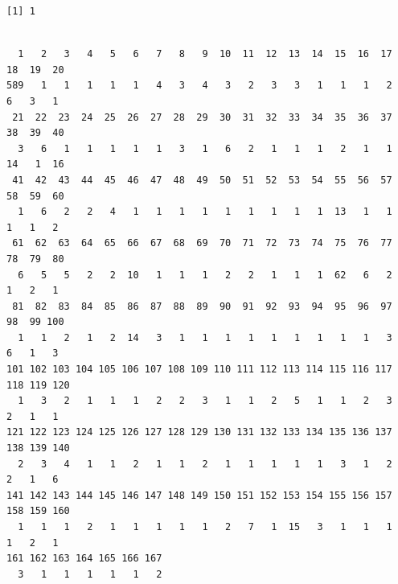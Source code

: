 \documentclass[
  letterpaper,
  DIV=11,
  numbers=noendperiod]{scrreprt}
\newenvironment{Shaded}{}{}
\newcommand{\FunctionTok}[1]{\textcolor[rgb]{0.38,0.69,0.94}{#1}}
\newcommand{\NormalTok}[1]{\textcolor[rgb]{0.67,0.70,0.75}{#1}}
\newcommand{\OtherTok}[1]{\textcolor[rgb]{0.15,0.68,0.38}{#1}}
\newcommand{\SpecialCharTok}[1]{\textcolor[rgb]{0.34,0.71,0.76}{#1}}
\begin{document}
\begin{Shaded}
\end{Shaded}

\begin{verbatim}
[1] 1
\end{verbatim}

\begin{Shaded}
\end{Shaded}

\begin{verbatim}

  1   2   3   4   5   6   7   8   9  10  11  12  13  14  15  16  17  18  19  20 
589   1   1   1   1   1   4   3   4   3   2   3   3   1   1   1   2   6   3   1 
 21  22  23  24  25  26  27  28  29  30  31  32  33  34  35  36  37  38  39  40 
  3   6   1   1   1   1   1   3   1   6   2   1   1   1   2   1   1  14   1  16 
 41  42  43  44  45  46  47  48  49  50  51  52  53  54  55  56  57  58  59  60 
  1   6   2   2   4   1   1   1   1   1   1   1   1   1  13   1   1   1   1   2 
 61  62  63  64  65  66  67  68  69  70  71  72  73  74  75  76  77  78  79  80 
  6   5   5   2   2  10   1   1   1   2   2   1   1   1  62   6   2   1   2   1 
 81  82  83  84  85  86  87  88  89  90  91  92  93  94  95  96  97  98  99 100 
  1   1   2   1   2  14   3   1   1   1   1   1   1   1   1   1   3   6   1   3 
101 102 103 104 105 106 107 108 109 110 111 112 113 114 115 116 117 118 119 120 
  1   3   2   1   1   1   2   2   3   1   1   2   5   1   1   2   3   2   1   1 
121 122 123 124 125 126 127 128 129 130 131 132 133 134 135 136 137 138 139 140 
  2   3   4   1   1   2   1   1   2   1   1   1   1   1   3   1   2   2   1   6 
141 142 143 144 145 146 147 148 149 150 151 152 153 154 155 156 157 158 159 160 
  1   1   1   2   1   1   1   1   1   2   7   1  15   3   1   1   1   1   2   1 
161 162 163 164 165 166 167 
  3   1   1   1   1   1   2 
\end{verbatim}

\begin{Shaded}
\end{Shaded}
\end{document}
